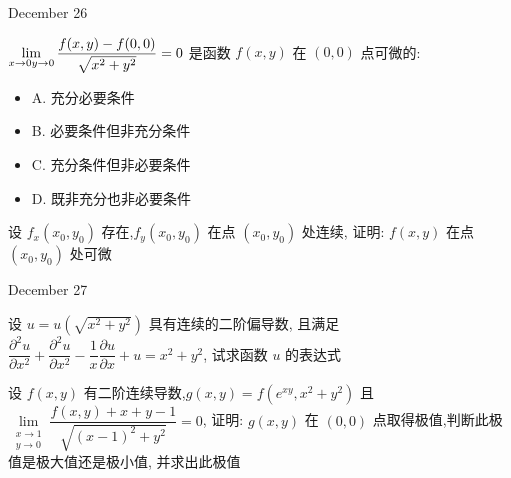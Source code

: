 \begin{solution}
	
\end{solution}


\textcolor{purplea}{December 26}

\begin{example}[][Exam: 38.4.9]
	$\lim\limits_{x\to 0\\y\to 0}\dfrac{f(x,y)-f(0,0)}{\sqrt{x^{2}+y^{2}}}=0$ 是函数 $f(x,y)$ 在 $(0,0)$ 点可微的:
\begin{itemize}
	\item A. 充分必要条件
	\item B. 必要条件但非充分条件
	\item C. 充分条件但非必要条件
	\item D. 既非充分也非必要条件
\end{itemize} 
\end{example}

\begin{solution}
	
\end{solution}

\begin{example}[][Exam: 38.4.10]
	设 $f_{x}(x_{0},y_{0})$ 存在,$f_{y}(x_{0},y_{0})$ 在点 $(x_{0},y_{0})$ 处连续, 证明: $f(x,y)$ 在点 $(x_{0},y_{0})$ 处可微
\end{example}

\begin{solution}
	
\end{solution}


\textcolor{purplea}{December 27}

\begin{example}[][Exam: 38.4.11]
	设 $u=u(\sqrt{x^{2}+y^{2}})$ 具有连续的二阶偏导数, 且满足 
	$\dfrac{\partial^{2} u}{\partial x^{2}}+\dfrac{\partial^{2} u}{\partial x^{2}}-\dfrac{1}{x}\dfrac{\partial u}{\partial x}+u=x^{2}+y^{2}$,
	试求函数 $u$ 的表达式 
\end{example}
\begin{solution}
	
\end{solution}

\begin{example}[][Exam: 38.4.12]
	设 $f(x,y)$ 有二阶连续导数,$g(x,y)=f(e^{xy},x^{2}+y^{2})$ 且 $\lim\limits_{\substack{x\to 1\\ y\to 0}}\dfrac{f(x,y)+x+y-1}{\sqrt{(x-1)^{2}+y^{2}}}=0$,
	证明: $g(x,y)$ 在 $(0,0)$ 点取得极值,判断此极值是极大值还是极小值, 并求出此极值
\end{example}

